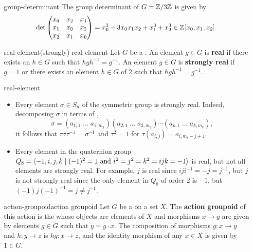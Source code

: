 \begin{example}{group-determinant}
    The group determinant of $G = \mathbb{Z}/3\mathbb{Z}$ is given by
    \[ \det \begin{pmatrix} x_{0} & x_{2} & x_{1} \\ x_{1} & x_{0} & x_{2} \\ x_{2} & x_{1} & x_{0} \end{pmatrix} = x_{0}^{3} - 3 x_{0} x_{1} x_{2} + x_{1}^{3} + x_{2}^{3} \in \mathbb{Z}[x_0, x_1, x_2] . \]
\end{example}

\begin{topic}{real-element}{(strongly) real element}
    Let $G$ be a . An element $g \in G$ is \textbf{real} if there exists an $h \in G$ such that $h g h^{-1} = g^{-1}$. An element $g \in G$ is \textbf{strongly real} if $g = 1$ or there exists an element $h \in G$ of  $2$ such that $h g h^{-1} = g^{-1}$.
\end{topic}

\begin{example}{real-element}
    \begin{itemize}
        \item Every element $\sigma \in S_n$ of the symmetric group is strongly real. Indeed, decomposing $\sigma$ in terms of ,
        \[ \sigma = (a_{1, 1} \; \ldots \; a_{1, m_1}) (a_{2, 1} \; \ldots \; a_{2, m_2}) \cdots (a_{k, 1} \; \ldots \; a_{k, m_k}) , \]
        it follows that $\tau \sigma \tau^{-1} = \sigma^{-1}$ and $\tau^2 = 1$ for $\tau(a_{i, j}) = a_{i, m_i - j + 1}$.
        \item Every element in the quaternion group $Q_8 = \langle -1, i, j, k \mid (-1)^2 = 1 \textup{ and } i^2 = j^2 = k^2 = ijk = -1 \rangle$ is real, but not all elements are strongly real. For example, $j$ is real since $i j i^{-1} = -j = j^{-1}$, but $j$ is not strongly real since the only element in $Q_8$ of order $2$ is $-1$, but $(-1) j (-1)^{-1} = j \ne j^{-1}$.
    \end{itemize}
\end{example}

\begin{topic}{action-groupoid}{action groupoid}
    Let $G$ be a   on a set $X$. The \textbf{action groupoid} of this action is the  whose objects are elements of $X$ and morphisms $x \to y$ are given by elements $g \in G$ such that $y = g \cdot x$. The composition of morphisms $g \colon x \to y$ and $h \colon y \to z$ is $hg \colon x \to z$, and the identity morphism of any $x \in X$ is given by $1 \in G$.
\end{topic}

